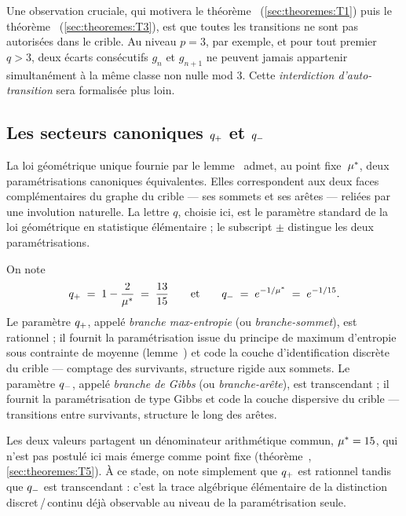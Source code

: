 Une observation cruciale, qui motivera le théorème~\Tone{} (\ref{sec:theoremes:T1}) puis le théorème~\Tthree{} (\ref{sec:theoremes:T3}), est que toutes les transitions ne sont pas autorisées dans le crible. Au niveau $p = 3$, par exemple, et pour tout premier $q > 3$, deux écarts consécutifs $g_n$ et $g_{n+1}$ ne peuvent jamais appartenir simultanément à la même classe non nulle mod $3$. Cette \emph{interdiction d'auto-transition} sera formalisée plus loin.

\subsection{Les secteurs canoniques \texorpdfstring{$q_{+}$}{q+} et \texorpdfstring{$q_{-}$}{q-}}
\label{sec:cadre:qpm}

La loi géométrique unique fournie par le lemme~\Lzero{} admet, au point fixe~$\mu^{*}$, deux paramétrisations canoniques équivalentes. Elles correspondent aux deux faces complémentaires du graphe du crible --- ses sommets et ses arêtes --- reliées par une involution naturelle. La lettre $q$, choisie ici, est le paramètre standard de la loi géométrique en statistique élémentaire ; le subscript $\pm$ distingue les deux paramétrisations.

\begin{convention}
\label{conv:qpm}
On note
\[
q_{+} \;=\; 1 - \dfrac{2}{\mu^{*}} \;=\; \dfrac{13}{15}
\qquad\text{et}\qquad
q_{-} \;=\; e^{-1/\mu^{*}} \;=\; e^{-1/15}.
\]
Le paramètre $q_{+}$, appelé \emph{branche max-entropie} (ou \emph{branche-sommet}), est rationnel ; il fournit la paramétrisation issue du principe de maximum d'entropie sous contrainte de moyenne (lemme~\Lzero) et code la couche d'identification discrète du crible --- comptage des survivants, structure rigide aux sommets. Le paramètre $q_{-}$, appelé \emph{branche de Gibbs} (ou \emph{branche-arête}), est transcendant ; il fournit la paramétrisation de type Gibbs et code la couche dispersive du crible --- transitions entre survivants, structure le long des arêtes.
\end{convention}

Les deux valeurs partagent un dénominateur arithmétique commun, $\mu^{*} = 15$, qui n'est pas postulé ici mais émerge comme point fixe (théorème~\Tfive{}, \ref{sec:theoremes:T5}). À ce stade, on note simplement que $q_{+}$ est rationnel tandis que $q_{-}$ est transcendant : c'est la trace algébrique élémentaire de la distinction discret\,/\,continu déjà observable au niveau de la paramétrisation seule.

